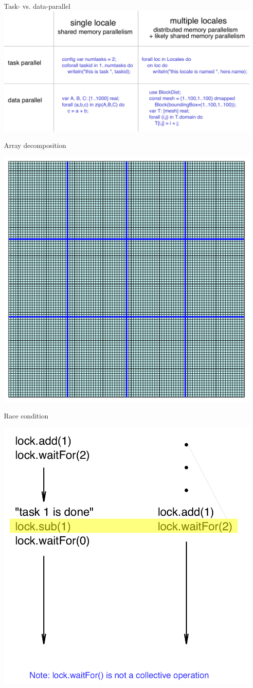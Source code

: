 \documentclass[10pt,xcolor=pdftex,dvipsnames,table]{beamer}
\begin{document}
\begin{frame}{Task- vs. data-parallel}
  \includegraphics[width=1.0\columnwidth]{parallel.pdf}
\end{frame}

\begin{frame}{Array decomposition}
  \begin{center}
    \includegraphics[width=0.68\columnwidth]{decomposition.pdf}
  \end{center}
\end{frame}

\begin{frame}{Race condition}
  \begin{center}
    \includegraphics[width=0.65\columnwidth]{raceCondition.pdf}
  \end{center}
\end{frame}
\end{document}
